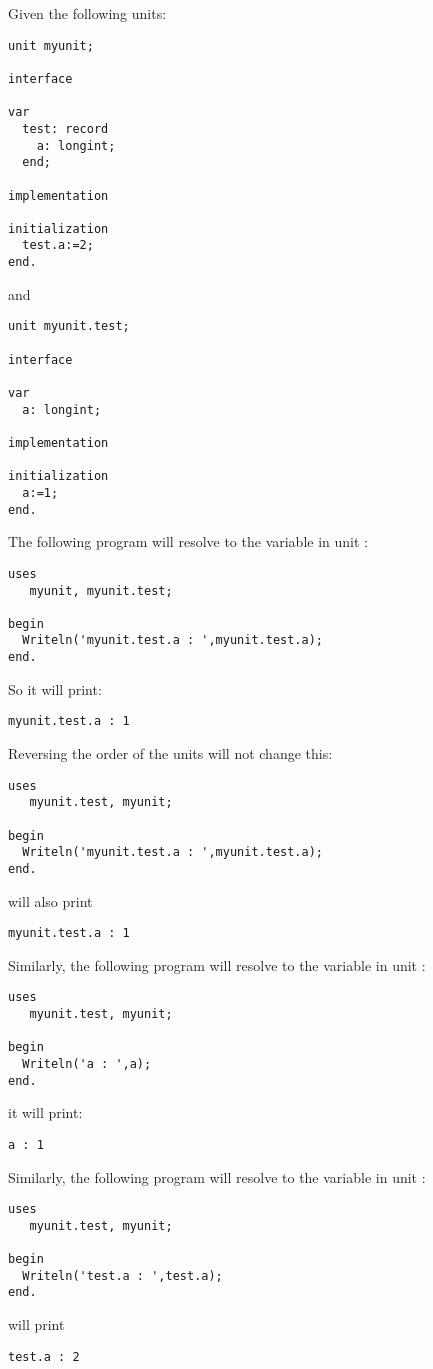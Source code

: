 Given the following units:
\begin{verbatim}
unit myunit;

interface

var
  test: record
    a: longint;
  end;
         
implementation
         
initialization
  test.a:=2;
end.
\end{verbatim}
and
\begin{verbatim}
unit myunit.test;

interface

var
  a: longint;
  
implementation

initialization
  a:=1;  
end.
\end{verbatim}
The following program will resolve  to the variable  in unit :
\begin{verbatim}
uses
   myunit, myunit.test;
   
begin
  Writeln('myunit.test.a : ',myunit.test.a);
end.
\end{verbatim}
So it will print:
\begin{verbatim}
myunit.test.a : 1
\end{verbatim}
Reversing the order of the units will not change this:
\begin{verbatim}
uses
   myunit.test, myunit;
   
begin
  Writeln('myunit.test.a : ',myunit.test.a);
end.
\end{verbatim}
will also print
\begin{verbatim}
myunit.test.a : 1
\end{verbatim}
Similarly, the following program will resolve  to the variable  in unit :
\begin{verbatim}
uses
   myunit.test, myunit;
   
begin
  Writeln('a : ',a);
end.
\end{verbatim}
it will print:
\begin{verbatim}
a : 1
\end{verbatim}
Similarly, the following program will resolve  to the variable  in unit :
\begin{verbatim}
uses
   myunit.test, myunit;
   
begin
  Writeln('test.a : ',test.a);
end.
\end{verbatim}
will print
\begin{verbatim}
test.a : 2
\end{verbatim}

